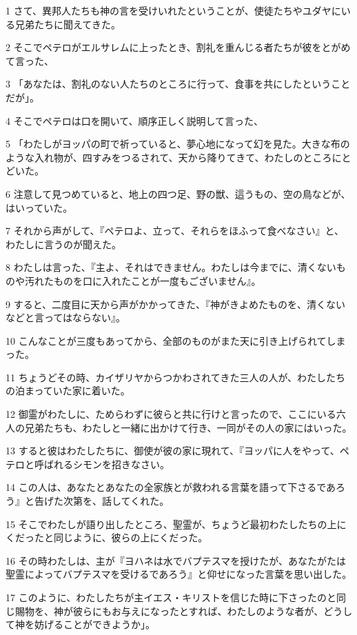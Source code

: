 \par 1 さて、異邦人たちも神の言を受けいれたということが、使徒たちやユダヤにいる兄弟たちに聞えてきた。
\par 2 そこでペテロがエルサレムに上ったとき、割礼を重んじる者たちが彼をとがめて言った、
\par 3 「あなたは、割礼のない人たちのところに行って、食事を共にしたということだが」。
\par 4 そこでペテロは口を開いて、順序正しく説明して言った、
\par 5 「わたしがヨッパの町で祈っていると、夢心地になって幻を見た。大きな布のような入れ物が、四すみをつるされて、天から降りてきて、わたしのところにとどいた。
\par 6 注意して見つめていると、地上の四つ足、野の獣、這うもの、空の鳥などが、はいっていた。
\par 7 それから声がして、『ペテロよ、立って、それらをほふって食べなさい』と、わたしに言うのが聞えた。
\par 8 わたしは言った、『主よ、それはできません。わたしは今までに、清くないものや汚れたものを口に入れたことが一度もございません』。
\par 9 すると、二度目に天から声がかかってきた、『神がきよめたものを、清くないなどと言ってはならない』。
\par 10 こんなことが三度もあってから、全部のものがまた天に引き上げられてしまった。
\par 11 ちょうどその時、カイザリヤからつかわされてきた三人の人が、わたしたちの泊まっていた家に着いた。
\par 12 御霊がわたしに、ためらわずに彼らと共に行けと言ったので、ここにいる六人の兄弟たちも、わたしと一緒に出かけて行き、一同がその人の家にはいった。
\par 13 すると彼はわたしたちに、御使が彼の家に現れて、『ヨッパに人をやって、ペテロと呼ばれるシモンを招きなさい。
\par 14 この人は、あなたとあなたの全家族とが救われる言葉を語って下さるであろう』と告げた次第を、話してくれた。
\par 15 そこでわたしが語り出したところ、聖霊が、ちょうど最初わたしたちの上にくだったと同じように、彼らの上にくだった。
\par 16 その時わたしは、主が『ヨハネは水でバプテスマを授けたが、あなたがたは聖霊によってバプテスマを受けるであろう』と仰せになった言葉を思い出した。
\par 17 このように、わたしたちが主イエス・キリストを信じた時に下さったのと同じ賜物を、神が彼らにもお与えになったとすれば、わたしのような者が、どうして神を妨げることができようか」。
